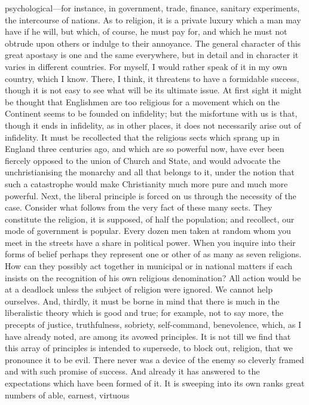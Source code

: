 psychological—for instance, in government, trade, finance, sanitary
experiments, the intercourse of nations. As to religion, it is a
private luxury which a man may have if he will, but which, of course,
he must pay for, and which he must not obtrude upon others or indulge
to their annoyance. The general character of this great apostasy is
one and the same everywhere, but in detail and in character it varies
in different countries. For myself, I would rather speak of it in my
own country, which I know. There, I think, it threatens to have a
formidable success, though it is not easy to see what will be its
ultimate issue. At first sight it might be thought that Englishmen are
too religious for a movement which on the Continent seems to be
founded on infidelity; but the misfortune with us is that, though
it ends in infidelity, as in other places, it does not necessarily
arise out of infidelity. It must be recollected that the religious
sects which sprang up in England three centuries ago, and which are so
powerful now, have ever been fiercely opposed to the union of Church
and State, and would advocate the unchristianising the monarchy and
all that belongs to it, under the notion that such a catastrophe would
make Christianity much more pure and much more powerful. Next, the
liberal principle is forced on us through the necessity of the case.
Consider what follows from the very fact of these many sects. They
constitute the religion, it is supposed, of half the population; and
recollect, our mode of government is popular. Every dozen men taken at
random whom you meet in the streets have a share in political power.
When you inquire into their forms of belief perhaps they represent one
or other of as many as seven religions. How can they possibly act
together in municipal or in national matters if each insists on the
recognition of his own religious denomination? All action would be at
a deadlock unless the subject of religion were ignored. We cannot help
ourselves. And, thirdly, it must be borne in mind that there is much
in the liberalistic theory which is good and true; for example, not to
say more, the precepts of justice, truthfulness, sobriety,
self-command, benevolence, which, as I have already noted, are among
its avowed principles. It is not till we find that this array of
principles is intended to supersede, to block out, religion, that we
pronounce it to be evil. There never was a device of the enemy so
cleverly framed and with such promise of success. And already it has
answered to the expectations which have been formed of it. It is
sweeping into its own ranks great numbers of able, earnest, virtuous
